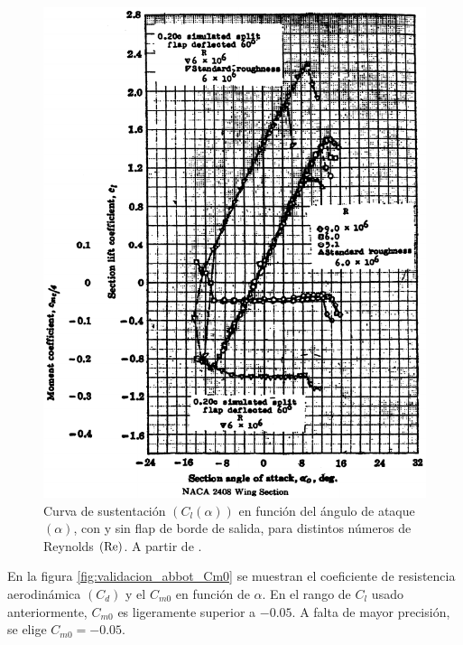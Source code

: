 \begin{figure}[ht] 
    \centering
    \includegraphics[width=\linewidth]{imagenes/validacion/validacion_abbot_Cl.pdf}
    \caption{Curva de sustentación $\left( C_l(\alpha) \right)$ en función del ángulo de ataque $\left( \alpha \right)$, con y sin flap de borde de salida, para distintos números de Reynolds $\left( \mathrm{Re} \right)$. A partir de \cite{abbott}.}
    \label{fig:validacion_abbot_Cl}
\end{figure}

En la figura \ref{fig:validacion_abbot_Cm0} se muestran el coeficiente de resistencia aerodinámica $\left( C_d \right)$ y el $C_{m0}$ en función de $\alpha$. En el rango de $C_l$ usado anteriormente, $C_{m0}$ es ligeramente superior a $-0.05$. A falta de mayor precisión, se elige $C_{m0} = -0.05$.

